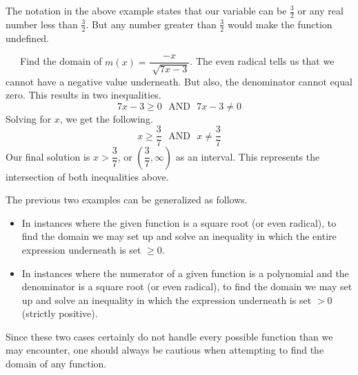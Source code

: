 The notation in the above example states that our variable can be
$\frac{3}{2}$ or any real number less than $\frac{3}{2}$. But any number greater
than $\frac{3}{2}$ would make the function undefined.
\newpage

\begin{example}~~~Find the domain of $m (x) = \dfrac{-x}{\sqrt[]{7x-3}}$.\pp
  The even radical tells us that we cannot have a negative value underneath.  But also, the denominator cannot equal zero.  This results in two inequalities.
		$$7x - 3 \geq  0 \text{~~AND~~} 7x-3 \neq 0$$
Solving for $x$, we get the following.
$$	x \geq \frac{3}{7} \text{~~AND~~} x \neq \frac{3}{7}$$
Our final solution is $x > \dfrac{3}{7}$, or $\left(\dfrac{3}{7},\infty\right)$ as an interval.  This represents the intersection of both inequalities above.
\end{example}

The previous two examples can be generalized as follows.
\begin{itemize}
	\item In instances where the given function is a square root (or even radical), to find the domain we may set up and solve an inequality in which the entire expression underneath is set $\geq 0$.
	\item In instances where the numerator of a given function is a polynomial and the denominator is a square root (or even radical), to find the domain we may set up and solve an inequality in which the expression underneath is set $> 0$ (strictly positive).
\end{itemize}
Since these two cases certainly do not handle every possible function than we may encounter, one should always be cautious when attempting to find the domain of any function.